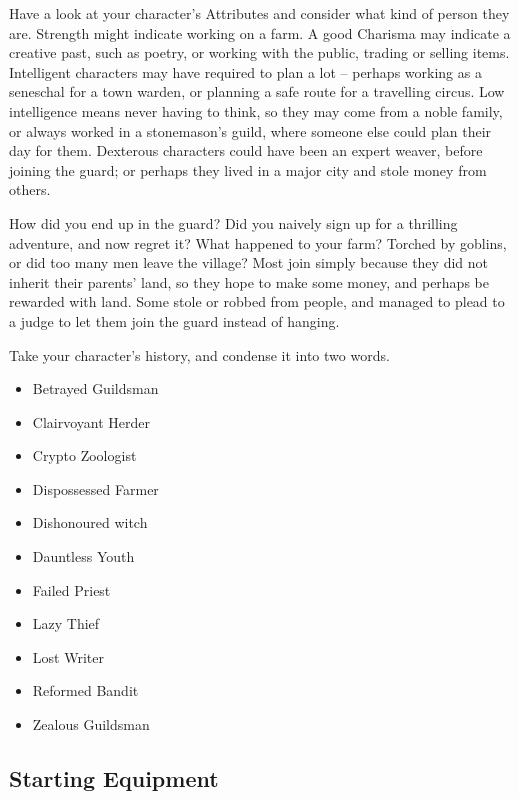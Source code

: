 \begin{multicols}{2}
Have a look at your character's Attributes and consider what kind of person they are.
Strength might indicate working on a farm.
A good Charisma may indicate a creative past, such as poetry, or working with the public, trading or selling items.
Intelligent characters may have required to plan a lot -- perhaps working as a seneschal for a town \gls{warden}, or planning a safe route for a travelling circus.
Low intelligence means never having to think, so they may come from a noble family, or always worked in a stonemason's guild, where someone else could plan their day for them.
Dexterous characters could have been an expert weaver, before joining the \gls{guard}; or perhaps they lived in a major city and stole money from others.

How did you end up in the \gls{guard}?
Did you naively sign up for a thrilling adventure, and now regret it?
What happened to your farm?
Torched by goblins, or did too many men leave the village?
Most join simply because they did not inherit their parents' land, so they hope to make some money, and perhaps be rewarded with land.
Some stole or robbed from people, and managed to plead to a judge to let them join the \gls{guard} instead of hanging.

Take your character's history, and condense it into two words.

\begin{multicols}{2}
\begin{itemize}
  \item
  Betrayed Guildsman
  \item
  Clairvoyant Herder
  \item
  Crypto Zoologist
  \item
  Dispossessed Farmer
  \item
  Dishonoured witch
  \item
  Dauntless Youth
  \item
  Failed Priest
  \item
  Lazy Thief
  \item
  Lost Writer
  \item
  Reformed Bandit
  \item
  Zealous Guildsman
\end{itemize}
\end{multicols}

\subsection{Starting Equipment}
\label{start_equipment}


\end{multicols}
